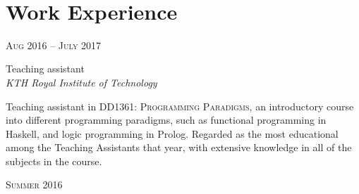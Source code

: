 \documentclass[10pt]{article} %
\begin{document}
\color{text1} %


\par{\\ %
	

\begin{minipage}[t]{0.5\textwidth} %
\vspace{0pt} %
	

\section{Work Experience} 


{\raggedleft\textsc{Aug 2016 -- July 2017}\par}

{\raggedright\large Teaching assistant\\ \textit{KTH Royal Institute of Technology}\\[5pt]}

    \normalsize{Teaching assistant in \textsc{DD1361: Programming Paradigms}, an introductory course into different programming paradigms, such as functional programming in Haskell, and logic programming in Prolog. Regarded as the most educational among the Teaching Assistants that year, with extensive knowledge in all of the subjects in the course.}\\

{\raggedleft\textsc{Summer 2016}\par}


\end{minipage}}
\end{document}
